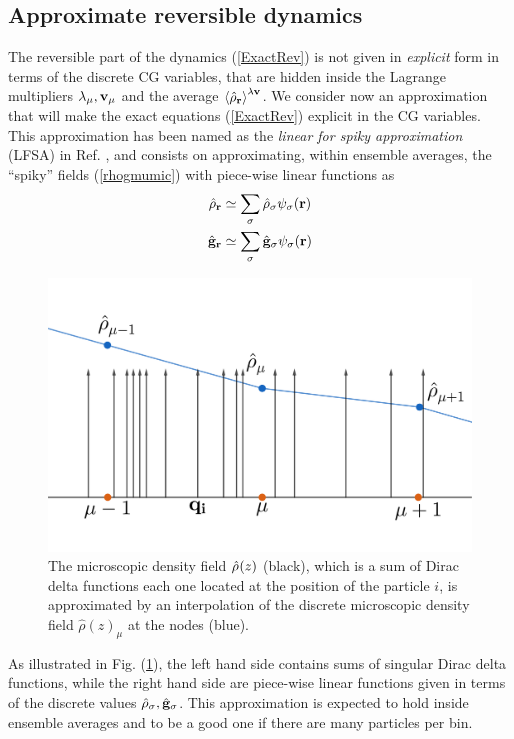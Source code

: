 \documentclass[b5paper,openright,11pt]{book}
\newcommand{\llangle}{\left\langle}
\newcommand{\rrangle}{\right\rangle}
\begin{document}
\subsection{Approximate reversible dynamics}
The reversible part  of the dynamics (\ref{ExactRev}) is  not given in
\textit{explicit} form in terms of the discrete CG variables, that are
hidden inside  the Lagrange multipliers $\lambda_\mu,{\bf  v}_\mu$ and
the  average $\llangle  \hat{\rho}_{\bf r}\rrangle^{\lambda{\bf  v}}$.
We consider  now an approximation  that will make the  exact equations
(\ref{ExactRev}) explicit in the CG variables.  This approximation has
been named  as the \textit{linear  for spiky approximation}  (LFSA) in
Ref.   \cite{Donev},  and  consists on  approximating,  within  ensemble
averages,  the ``spiky''  fields (\ref{rhogmumic})  with piece-wise
linear functions as 
\begin{align}
  \hat{\rho}_{\bf r}&\simeq \sum_\sigma\hat{\rho}_{\sigma} \psi_\sigma({\bf r})
\nonumber\\
  \hat{\bf g}_{\bf r} &\simeq \sum_\sigma\hat{\bf g}_{\sigma} \psi_\sigma({\bf r})
\label{LFSA}
\end{align}
\begin{figure}
    \centering
    \includegraphics[scale=0.2]{spiky}
    \caption[``Spiky'' aproximation]{The microscopic density field $\hat{\rho}_{\bf}(z)$ (black), which is a sum of Dirac delta functions each one located at the position of the particle $i$, is approximated by an interpolation of the discrete microscopic density field $\hat{\rho}(z)_{\mu}$ at the nodes (blue).}
    \label{fig:spiky}
\end{figure}
As illustrated in Fig. (\ref{fig:spiky}), the left  hand side contains  sums of singular Dirac  delta functions,
while the  right hand  side are piece-wise  linear functions  given in
terms   of   the  discrete   values   $\hat{\rho}_{\sigma} ,\hat{\bf
  g}_\sigma $.   This  approximation  is  expected  to  hold  inside
ensemble averages and to be a good one if there are many particles per
bin. 
\end{document}
